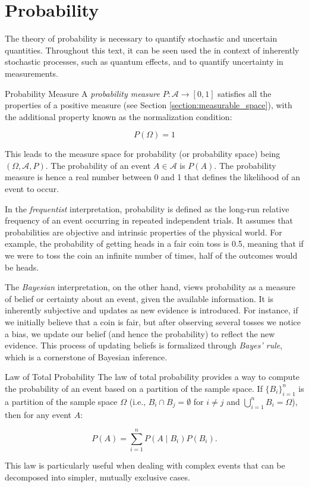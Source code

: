 \section{Probability}\label{section:probability-notation}
The theory of probability is necessary to quantify stochastic and uncertain quantities. Throughout this text, it can be seen used the in context of inherently stochastic processes, such as quantum effects, and to quantify uncertainty in measurements.

\begin{note}
    {Probability Measure}
A \textit{probability measure} $P: \mathcal{A} \to [0, 1]$ satisfies all the properties of a positive measure (see Section \ref{section:measurable_space}), with the additional property known as the normalization condition:

\begin{equation*}
    P(\Omega) = 1
\end{equation*}

This leads to the measure space for probability (or probability space) being $(\Omega, \mathcal{A}, P)$. The probability of an event $A \in \mathcal{A}$ is $P(A)$. The probability measure is hence a real number between 0 and 1 that defines the likelihood of an event to occur.
\end{note}

In the \textit{frequentist} interpretation, probability is defined as the long-run relative frequency of an event occurring in repeated independent trials. It assumes that probabilities are objective and intrinsic properties of the physical world. For example, the probability of getting heads in a fair coin toss is 0.5, meaning that if we were to toss the coin an infinite number of times, half of the outcomes would be heads.

The \textit{Bayesian} interpretation, on the other hand, views probability as a measure of belief or certainty about an event, given the available information. It is inherently subjective and updates as new evidence is introduced. For instance, if we initially believe that a coin is fair, but after observing several tosses we notice a bias, we update our belief (and hence the probability) to reflect the new evidence. This process of updating beliefs is formalized through \textit{Bayes' rule}, which is a cornerstone of Bayesian inference.

\begin{note}{Law of Total Probability}
    The law of total probability provides a way to compute the probability of an event based on a partition of the sample space. If $\{B_i\}_{i=1}^{n}$ is a partition of the sample space $\Omega$ (i.e., $B_i \cap B_j = \emptyset$ for $i \neq j$ and $\bigcup_{i=1}^{n} B_i = \Omega$), then for any event $A$:

    \begin{equation}
        P(A) = \sum_{i=1}^{n} P(A \mid B_i) P(B_i).
    \end{equation}
    
    This law is particularly useful when dealing with complex events that can be decomposed into simpler, mutually exclusive cases.
    
\end{note}

